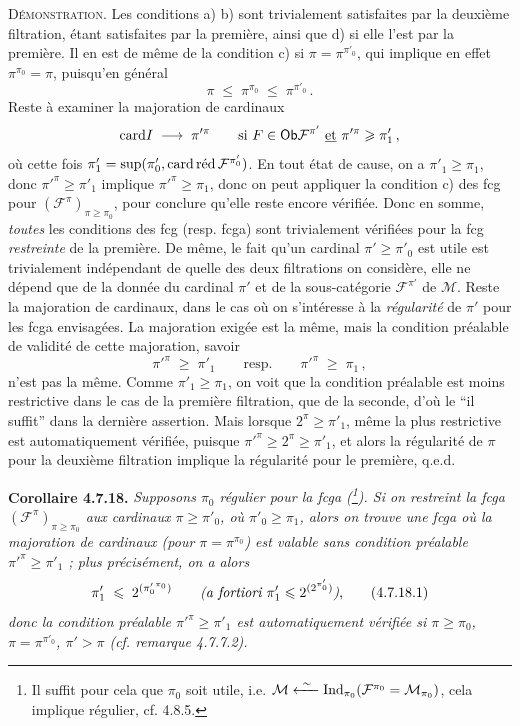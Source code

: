 \textsc{Démonstration}. Les conditions a) b) sont trivialement satisfaites par la deuxième filtration, étant satisfaites par la première, ainsi que d) si elle l'est par la première. Il en est de même de la condition c) si $\pi=\pi^{\pi'_0}$, qui implique en effet $\pi^{\pi_0}=\pi$, puisqu'en général
\[
\pi \;\leqslant\; \pi^{\pi_0} \;\leqslant\; \pi^{\pi'_0} \, .
\]
Reste à examiner la majoration de cardinaux
\[
\card I \;\longrightarrow\; \pi'^{\pi} \qquad \text{si } F\in\Ob\mathcal{F}^{\pi'} \ \underline{\text{et}}\ \pi'^{\pi}\geqslant\pi'_1 \, , %
\]
où cette fois $\pi'_1=\sup(\pi'_0,\cardred\mathcal{F}^{\pi'_0})$. En tout état de cause, on a $\pi'_1\geqslant\pi_1$, donc
$\pi'^{\pi}\geqslant\pi'_1$ implique $\pi'^{\pi}\geqslant\pi_1$, donc on peut appliquer la condition c) des fcg pour $(\mathcal{F}^{\pi})_{\pi\geqslant\pi_0}$, pour conclure qu'elle reste encore vérifiée. Donc en somme, \textit{toutes} les conditions des fcg (resp. fcga) sont trivialement vérifiées pour la fcg \textit{restreinte} de la première. De même, le fait qu'un cardinal $\pi'\geqslant\pi'_0$ est utile est trivialement indépendant de quelle des deux filtrations on considère, elle ne dépend que de la donnée du cardinal $\pi'$ et de la sous-catégorie $\mathcal{F}^{\pi'}$ de $\mathcal{M}$. Reste la majoration de cardinaux, dans le cas où on s'intéresse à la \textit{régularité} de $\pi'$ pour les fcga envisagées. La majoration exigée est la même, mais la condition préalable de validité de cette majoration, savoir
\[
\pi'^{\pi} \;\geqslant\; \pi'_1 \qquad \text{resp.} \qquad \pi'^{\pi} \;\geqslant\; \pi_1 \, ,
\]
n'est pas la même. Comme $\pi'_1\geqslant\pi_1$, on voit que la condition préalable est moins restrictive dans le cas de la première filtration, que de la seconde, d'où le ``il suffit'' dans la dernière assertion. Mais lorsque $2^{\pi}\geqslant\pi'_1$, même la plus restrictive est automatiquement vérifiée, puisque $\pi'^{\pi}\geqslant 2^{\pi}\geqslant\pi'_1$, et alors la régularité de $\pi$ pour la deuxième filtration implique la régularité pour le première, q.e.d. %

\noindent{}
\textbf{Corollaire 4.7.18.} \textit{Supposons $\pi_0$ régulier pour la fcga (\footnote[77]{Il suffit pour cela que $\pi_0$ soit utile, i.e. $\mathcal{M}\xleftarrow{\ \sim\ }\Ind_{\pi_0}(\mathcal{F}^{\pi_0}=\mathcal{M}_{\pi_0})$, cela implique régulier, cf. 4.8.5.}). Si on restreint la fcga $(\mathcal{F}^{\pi})_{\pi\geqslant\pi_0}$ aux cardinaux $\pi\geqslant\pi'_0$, où $\pi'_0\geqslant\pi_1$, alors on trouve une fcga où la majoration de cardinaux (pour $\pi=\pi^{\pi_0}$) est valable sans condition préalable $\pi'^{\pi}\geqslant\pi'_1$ ; plus précisément, on a alors}
\[
\pi'_1 \;\leqslant\; 2^{({\pi'_0}^{\pi_0})} \qquad \text{\textit{(a fortiori $\pi'_1\leqslant 2^{(2^{\pi'_0})}$)},} \tag*{(4.7.18.1)}
\]
\textit{donc la condition préalable $\pi'^{\pi}\geqslant\pi'_1$ est automatiquement vérifiée si $\pi\geqslant\pi_0$, $\pi=\pi^{\pi'_0}$, $\pi'>\pi$ (cf. remarque 4.7.7.2).}

